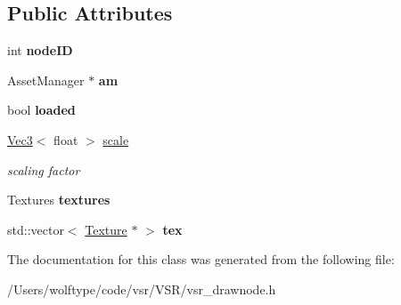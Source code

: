 \subsection*{Public Attributes}
\begin{DoxyCompactItemize}
\item 
\hypertarget{classvsr_1_1_material_node_a6a687c14481b63b4f4852504b5aafe22}{int {\bfseries node\-I\-D}}\label{classvsr_1_1_material_node_a6a687c14481b63b4f4852504b5aafe22}

\item 
\hypertarget{classvsr_1_1_material_node_a4a0a2fde699c68e2ab19c408e0a31db8}{Asset\-Manager $\ast$ {\bfseries am}}\label{classvsr_1_1_material_node_a4a0a2fde699c68e2ab19c408e0a31db8}

\item 
\hypertarget{classvsr_1_1_material_node_a49e2f9d563092b8ce32cb1692203cfcf}{bool {\bfseries loaded}}\label{classvsr_1_1_material_node_a49e2f9d563092b8ce32cb1692203cfcf}

\item 
\hypertarget{classvsr_1_1_material_node_af2887b82c93a375d640887f8e3918596}{\hyperlink{classvsr_1_1_vec3}{Vec3}$<$ float $>$ \hyperlink{classvsr_1_1_material_node_af2887b82c93a375d640887f8e3918596}{scale}}\label{classvsr_1_1_material_node_af2887b82c93a375d640887f8e3918596}

\begin{DoxyCompactList}\small\item\em scaling factor \end{DoxyCompactList}\item 
\hypertarget{classvsr_1_1_material_node_aacb7c6b0fd31086d344ac1bef39dbb50}{Textures {\bfseries textures}}\label{classvsr_1_1_material_node_aacb7c6b0fd31086d344ac1bef39dbb50}

\item 
\hypertarget{classvsr_1_1_material_node_a75f8e3c066aa123cb65ff675798db826}{std\-::vector$<$ \hyperlink{classvsr_1_1_texture}{Texture} $\ast$ $>$ {\bfseries tex}}\label{classvsr_1_1_material_node_a75f8e3c066aa123cb65ff675798db826}

\end{DoxyCompactItemize}


The documentation for this class was generated from the following file\-:\begin{DoxyCompactItemize}
\item 
/\-Users/wolftype/code/vsr/\-V\-S\-R/vsr\-\_\-drawnode.\-h\end{DoxyCompactItemize}
